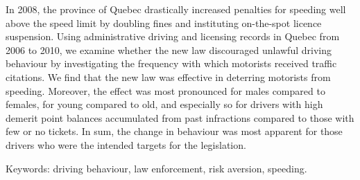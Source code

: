 

In 2008, the province of Quebec drastically increased penalties for speeding 
well above the speed limit by doubling fines and instituting on-the-spot licence suspension. 
Using administrative driving and licensing records in Quebec from 2006 to 2010, 
we examine whether the new law discouraged unlawful driving behaviour 
by investigating the frequency with which motorists received traffic citations. 
We find that the new law was effective in deterring motorists from speeding.
Moreover, the effect was most pronounced for males compared to females, 
for young compared to old, 
and especially so for drivers with high demerit point balances accumulated from past
infractions compared to those with few or no tickets. 
In sum, the change in behaviour was most apparent for 
those drivers who were the intended targets for the legislation. 


\medskip
\noindent
Keywords: driving behaviour, law enforcement, risk aversion, speeding.
